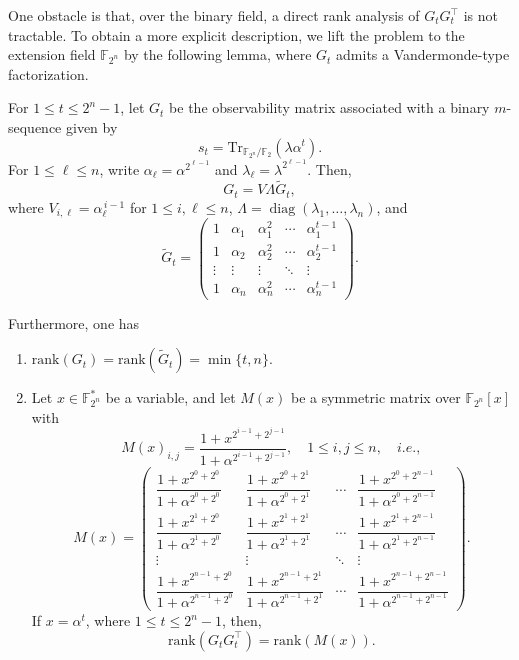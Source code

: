 \documentclass[hidelinks,onefignum,onetabnum]{siamart251216}
\theoremstyle{definition}
\theoremstyle{remark}
\providecommand{\rank}{{\mathrm{rank}}}
\providecommand{\Tr}{{\mathrm{Tr}}}
\begin{document}
One obstacle is that, over the binary field, a direct rank analysis of $G_tG_t^\top$ is not tractable. To obtain a more
explicit description, we lift the problem to the extension field $\mathbb F_{2^n}$ by the following lemma, where $G_t$ admits a
Vandermonde-type factorization. 
\begin{lemma}\label{lem:decomposition-Gt}
For $1\le t\le 2^{n}-1$, let $G_{t}$ be the observability matrix associated with a binary $m$-sequence given by
\[
s_t=\Tr_{\mathbb F_{2^n}/\mathbb F_2}(\lambda\alpha^t).
\] For $1\le \ell\le n$, write $\alpha_\ell=\alpha^{2^{\ell-1}}$ and $\lambda_\ell=\lambda^{2^{\ell-1}}$. Then, 
\[
G_t=V\Lambda \widetilde G_t,
\]
where $V_{i,\ell}=\alpha_\ell^{\,i-1}$ for $1\le i,\ell\le n$, $\Lambda=\operatorname{diag}(\lambda_1,\dots,\lambda_n)$, and
\begin{equation}
\widetilde G_t=
\begin{pmatrix}
	1 & \alpha_1 & \alpha_1^2 & \cdots & \alpha_1^{t-1}\\
	1 & \alpha_2 & \alpha_2^2 & \cdots & \alpha_2^{t-1}\\
	\vdots & \vdots & \vdots & \ddots & \vdots\\
	1 & \alpha_n & \alpha_n^2 & \cdots & \alpha_n^{t-1}
\end{pmatrix}.
\end{equation}
	
Furthermore, one has
	\begin{enumerate}
		\item $\rank(G_t)=\rank(\widetilde G_t)=\min\{t,n\}$.
		
		\item Let $x\in\mathbb F_{2^n}^*$ be a variable, and let $M(x)$ be a symmetric matrix over $\mathbb{F}_{2^n}[x]$ with 
		\[
		M(x)_{i,j}=\frac{1+x^{2^{i-1}+2^{j-1}}}{1+\alpha^{2^{i-1}+2^{j-1}}}, \quad 1\le i,j\le n, \quad i.e., \]
 \begin{equation}\label{eq M}
M(x)=
\begin{pmatrix}
	\dfrac{1+x^{2^0+2^0}}{1+\alpha^{2^0+2^0}}
	&
	\dfrac{1+x^{2^0+2^1}}{1+\alpha^{2^0+2^1}}
	&
	\cdots
	&
	\dfrac{1+x^{2^0+2^{n-1}}}{1+\alpha^{2^0+2^{n-1}}}
	\\[1.2ex]
	\dfrac{1+x^{2^1+2^0}}{1+\alpha^{2^1+2^0}}
	&
	\dfrac{1+x^{2^1+2^1}}{1+\alpha^{2^1+2^1}}
	&
	\cdots
	&
	\dfrac{1+x^{2^1+2^{n-1}}}{1+\alpha^{2^1+2^{n-1}}}
	\\
	\vdots & \vdots & \ddots & \vdots
	\\
	\dfrac{1+x^{2^{n-1}+2^0}}{1+\alpha^{2^{n-1}+2^0}}
	&
	\dfrac{1+x^{2^{n-1}+2^1}}{1+\alpha^{2^{n-1}+2^1}}
	&
	\cdots
	&
	\dfrac{1+x^{2^{n-1}+2^{n-1}}}{1+\alpha^{2^{n-1}+2^{n-1}}}
\end{pmatrix}.
\end{equation}
		If $x=\alpha^t$, where $1\le t\le 2^{n}-1$, then, 
		\[
		\rank(G_tG_t^\top)=\rank(M(x)).
		\]
	\end{enumerate}
\end{lemma}
\end{document}
